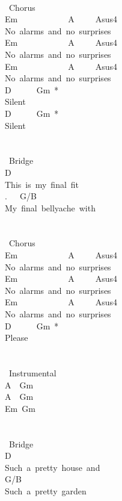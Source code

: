 {\\
\lbrack\ Chorus\rbrack\\
Em\ \ \ \ \ \ \ \ \ \ \ \ A\ \ \ \ \ Asus4\\
No\ alarms\ and\ no\ surprises\\
Em\ \ \ \ \ \ \ \ \ \ \ \ A\ \ \ \ \ Asus4\\
No\ alarms\ and\ no\ surprises\\
Em\ \ \ \ \ \ \ \ \ \ \ \ A\ \ \ \ \ Asus4\\
No\ alarms\ and\ no\ surprises\\
D\ \ \ \ \ \ Gm\ *\\
Silent\\
D\ \ \ \ \ \ Gm\ *\\
Silent\\
\\
\\
\lbrack\ Bridge\rbrack\\
D\\
This\ is\ my\ final\ fit\\
.\ \ \ G/B\\
My\ final\ bellyache\ with\\
\\
\\
\lbrack\ Chorus\rbrack\\
Em\ \ \ \ \ \ \ \ \ \ \ \ A\ \ \ \ \ Asus4\\
No\ alarms\ and\ no\ surprises\\
Em\ \ \ \ \ \ \ \ \ \ \ \ A\ \ \ \ \ Asus4\\
No\ alarms\ and\ no\ surprises\\
Em\ \ \ \ \ \ \ \ \ \ \ \ A\ \ \ \ \ Asus4\\
No\ alarms\ and\ no\ surprises\\
D\ \ \ \ \ \ Gm\ *\\
Please\\
\\
\\
\lbrack\ Instrumental\rbrack\\
A\ \ Gm\\
A\ \ Gm\\
Em\ Gm\\
\\
\\
\lbrack\ Bridge\rbrack\\
D\\
Such\ a\ pretty\ house\ and\\
G/B\\
Such\ a\ pretty\ garden\\
}
